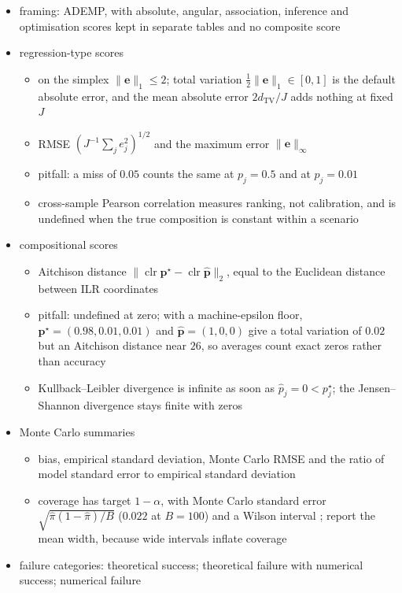 \begin{itemize}
  \item framing: ADEMP, with absolute, angular, association, inference and optimisation scores kept in separate
        tables and no composite score
        \cite{morrisUsingSimulationStudies2019,sturmComprehensiveEvaluationTranscriptomebased2019}
  \item regression-type scores
  \begin{itemize}
    \item on the simplex \(\lVert\boldsymbol{e}\rVert_{1}\le2\); total variation \(\tfrac12\lVert\boldsymbol{e}\rVert_{1}\in[0,1]\) is the
          default absolute error, and the mean absolute error \(2d_{\mathrm{TV}}/J\) adds nothing at fixed \(J\)
    \item RMSE \((J^{-1}\sum_{j}e_{j}^{2})^{1/2}\) and the maximum error \(\lVert\boldsymbol{e}\rVert_{\infty}\)
    \item pitfall: a miss of \(0.05\) counts the same at \(p_{j}=0.5\) and at \(p_{j}=0.01\)
    \item cross-sample Pearson correlation measures ranking, not calibration, and is undefined when the true
          composition is constant within a scenario
  \end{itemize}
  \item compositional scores
  \begin{itemize}
    \item Aitchison distance \(\lVert\operatorname{clr}\boldsymbol{p}^{\star}-\operatorname{clr}\hat{\boldsymbol{p}}\rVert_{2}\), equal to the
          Euclidean distance between ILR coordinates
          \cite{aitchisonStatisticalAnalysisCompositional1982,egozcueIsometricLogratioTransformations2003}
    \item pitfall: undefined at zero; with a machine-epsilon floor,
          \(\boldsymbol{p}^{\star}=(0.98,0.01,0.01)\) and \(\hat{\boldsymbol{p}}=(1,0,0)\) give a total variation of \(0.02\) but an
          Aitchison distance near \(26\), so averages count exact zeros rather than accuracy
    \item Kullback--Leibler divergence is infinite as soon as \(\hat p_{j}=0<p^{\star}_{j}\); the Jensen--Shannon
          divergence stays finite with zeros
  \end{itemize}
  \item Monte Carlo summaries
  \begin{itemize}
    \item bias, empirical standard deviation, Monte Carlo RMSE and the ratio of model standard error to empirical
          standard deviation
    \item coverage has target \(1-\alpha\), with Monte Carlo standard error \(\sqrt{\hat\pi(1-\hat\pi)/B}\)
          (\(0.022\) at \(B=100\)) and a Wilson interval \cite{wilsonProbableInferenceLaw1927}; report the mean width,
          because wide intervals inflate coverage
  \end{itemize}
  \item failure categories: theoretical success; theoretical failure with numerical success; numerical failure
\end{itemize}


